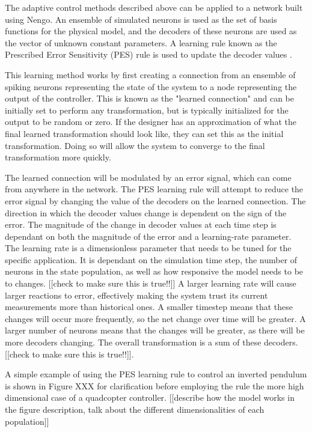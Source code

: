 \documentclass[letterpaper,12pt,titlepage,oneside,final]{book}
\begin{document}
The adaptive control methods described above can be applied to a network built using Nengo. 
An ensemble of simulated neurons is used as the set of basis functions for the physical model, and the decoders of these neurons are used as the vector of unknown constant parameters. 
A learning rule known as the Prescribed Error Sensitivity (PES) rule is used to update the decoder values \cite{bekolay2013simultaneous}. 

This learning method works by first creating a connection from an ensemble of spiking neurons representing the state of the system to a node representing the output of the controller. 
This is known as the "learned connection" and can be initially set to perform any transformation, but is typically initialized for the output to be random or zero. 
If the designer has an approximation of what the final learned transformation should look like, they can set this as the initial transformation. 
Doing so will allow the system to converge to the final transformation more quickly.

The learned connection will be modulated by an error signal, which can come from anywhere in the network. 
The PES learning rule will attempt to reduce the error signal by changing the value of the decoders on the learned connection. 
The direction in which the decoder values change is dependent on the sign of the error. 
The magnitude of the change in decoder values at each time step is dependant on both the magnitude of the error and a learning-rate parameter. 
The learning rate is a dimensionless parameter that needs to be tuned for the specific application. 
It is dependant on the simulation time step, the number of neurons in the state population, as well as how responsive the model needs to be to changes. [[check to make sure this is true!!]] 
A larger learning rate will cause larger reactions to error, effectively making the system trust its current measurements more than historical ones. 
A smaller timestep means that these changes will occur more frequently, so the net change over time will be greater. 
A larger number of neurons means that the changes will be greater, as there will be more decoders changing. The overall transformation is a sum of these decoders. [[check to make sure this is true!!]].

A simple example of using the PES learning rule to control an inverted pendulum is shown in Figure XXX for clarification before employing the rule the more high dimensional case of a quadcopter controller. [[describe how the model works in the figure description, talk about the different dimensionalities of each population]]
\end{document}
